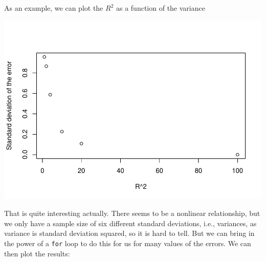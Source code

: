 \documentclass[
]{book}
\newenvironment{Shaded}{\begin{snugshade}}{\end{snugshade}}
\newcommand{\AttributeTok}[1]{\textcolor[rgb]{0.13,0.29,0.53}{#1}}
\newcommand{\DecValTok}[1]{\textcolor[rgb]{0.00,0.00,0.81}{#1}}
\newcommand{\FunctionTok}[1]{\textcolor[rgb]{0.13,0.29,0.53}{\textbf{#1}}}
\newcommand{\NormalTok}[1]{#1}
\newcommand{\SpecialCharTok}[1]{\textcolor[rgb]{0.81,0.36,0.00}{\textbf{#1}}}
\newcommand{\StringTok}[1]{\textcolor[rgb]{0.31,0.60,0.02}{#1}}
\begin{document}
As an example, we can plot the \(R^2\) as a function of the variance

\begin{Shaded}
\end{Shaded}

\includegraphics{ECOMODbook_files/figure-latex/a6.30-1.pdf}

That is quite interesting actually. There seems to be a nonlinear relationship, but we only have a sample size of six different standard deviations, i.e., variances, as variance is standard deviation squared, so it is hard to tell. But we can bring in the power of a \texttt{for} loop to do this for us for many values of the errors. We can then plot the results:
\end{document}
